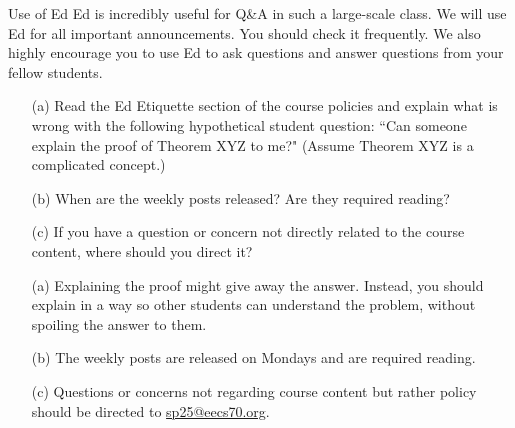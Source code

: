 \begin{homeworkProblem}{Use of Ed}
    Ed is incredibly useful for Q\&A in such a large-scale class. We will 
    use Ed for all important announcements. You should check it frequently. 
    We also highly encourage you to use Ed to ask questions and answer 
    questions from your fellow students.

    \begin{itemize}
        \item[(a)] Read the Ed Etiquette section of the course policies and 
        explain what is wrong with the following hypothetical student 
        question: ``Can someone explain the proof of Theorem XYZ to me?" 
        (Assume Theorem XYZ is a complicated concept.)
        \item[(b)] When are the weekly posts released? Are they required 
        reading?
        \item[(c)] If you have a question or concern not directly related 
        to the course content, where should you direct it? 
    \end{itemize}

    \solution

    \begin{itemize}
        \item[(a)] Explaining the proof might give away the answer. 
        Instead, you should explain in a way so other students can 
        understand the problem, without spoiling the answer to them. 
        \item[(b)] The weekly posts are released on Mondays and are 
        required reading.
        \item[(c)] Questions or concerns not regarding course content but 
        rather policy should be directed to \href{mailto:sp25@eecs70.org}
        {sp25@eecs70.org}.
    \end{itemize}
    
\end{homeworkProblem}